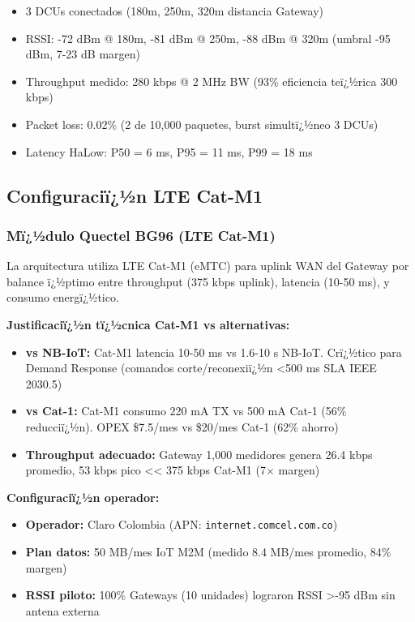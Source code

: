 \begin{itemize}
    \item 3 DCUs conectados (180m, 250m, 320m distancia Gateway)
    \item RSSI: -72 dBm @ 180m, -81 dBm @ 250m, -88 dBm @ 320m (umbral -95 dBm, 7-23 dB margen)
    \item Throughput medido: 280 kbps @ 2 MHz BW (93\% eficiencia teï¿½rica 300 kbps)
    \item Packet loss: 0.02\% (2 de 10,000 paquetes, burst simultï¿½neo 3 DCUs)
    \item Latency HaLow: P50 = 6 ms, P95 = 11 ms, P99 = 18 ms
\end{itemize}

\subsection{Configuraciï¿½n LTE Cat-M1}
\label{sec:impl-config-lte}

\subsubsection{Mï¿½dulo Quectel BG96 (LTE Cat-M1)}

La arquitectura utiliza LTE Cat-M1 (eMTC) para uplink WAN del Gateway por balance ï¿½ptimo entre throughput (375 kbps uplink), latencia (10-50 ms), y consumo energï¿½tico.

\textbf{Justificaciï¿½n tï¿½cnica Cat-M1 vs alternativas:}

\begin{itemize}
    \item \textbf{vs NB-IoT:} Cat-M1 latencia 10-50 ms vs 1.6-10 s NB-IoT. Crï¿½tico para Demand Response (comandos corte/reconexiï¿½n <500 ms SLA IEEE 2030.5)
    \item \textbf{vs Cat-1:} Cat-M1 consumo 220 mA TX vs 500 mA Cat-1 (56\% reducciï¿½n). OPEX \$7.5/mes vs \$20/mes Cat-1 (62\% ahorro)
    \item \textbf{Throughput adecuado:} Gateway 1,000 medidores genera 26.4 kbps promedio, 53 kbps pico << 375 kbps Cat-M1 (7$\times$ margen)
\end{itemize}

\textbf{Configuraciï¿½n operador:}

\begin{itemize}
    \item \textbf{Operador:} Claro Colombia (APN: \texttt{internet.comcel.com.co})
    \item \textbf{Plan datos:} 50 MB/mes IoT M2M (medido 8.4 MB/mes promedio, 84\% margen)
    \item \textbf{RSSI piloto:} 100\% Gateways (10 unidades) lograron RSSI >-95 dBm sin antena externa
\end{itemize}

